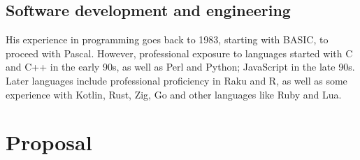 \documentclass[a4paper]{article}
\begin{document}
\subsection{Software development and engineering}

His experience in programming goes back to 1983, starting with BASIC, to proceed with Pascal. However, professional exposure to languages started with C and C++ in the early 90s, as well as Perl and Python; JavaScript in the late 90s. Later languages include professional proficiency in Raku and R, as well as some experience with Kotlin, Rust, Zig, Go and other languages like Ruby and Lua.

\section{Proposal}



\end{document}
